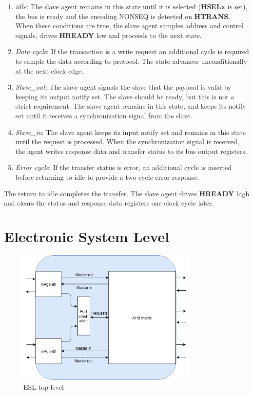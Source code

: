 \begin{enumerate}
 \item \textit{idle}: The slave agent remains in this state until it is selected (\textbf{HSELx} is set), the bus is ready and the encoding NONSEQ is detected on \textbf{HTRANS}. When these conditions are true, the slave agent samples address and control signals, drives \textbf{HREADY} low and proceeds to the next state. 
 \item \textit{Data cycle}: If the transaction is a write request an additional cycle is required to sample the data according to protocol. The state advances unconditionally at the next clock edge.
 \item \textit{Slave\_out}: The slave agent signals the slave that the payload is valid by keeping its output notify set. The slave should be ready, but this is not a strict requirement. The slave agent remains in this state, and keeps its notify set until it receives a synchronization signal from the slave.    
 \item \textit{Slave\_in}: The slave agent keeps its input notify set and remains in this state until the request is processed. When the synchronization signal is received, the agent writes response data and transfer status to its bus output registers. 
 \item \textit{Error cycle}: If the transfer status is error, an additional cycle is inserted before returning to idle to provide a two cycle error response. 
\end{enumerate}

The return to idle completes the transfer. The slave agent drives \textbf{HREADY} high and clears the status and response data registers one clock cycle later. 
 

\section{Electronic System Level}
\label{sec:syslev}
\begin{figure}[hbt]
    \begin{center}
        \includegraphics[width=0.8\textwidth]{figs/ESL/syslev_new.png}
    \end{center}
    \caption{ESL top-level}
    \label{fig:esl-top}
\end{figure}

